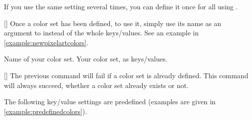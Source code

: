 \documentclass[
  load-preamble-,
  babel-options=english,
  add-index=true,
]{cnltx-doc}
\begin{document}
  If you use the same setting several times, you can define it once for all using .

\begin{commands}
  []
  Once a color set has been defined, to use it, simply use its name as an argument to  instead of the whole keys/values. See an example in \ref{example:newpixelartcolors}.
  \begin{options}
     Name of your color set.
     Your color set, as keys/values.
  \end{options}
  []
  The previous command will fail if a color set  is already defined. This command will always succeed, whether a color set  already exists or not.
\end{commands}

The following key/value settings are predefined (examples are given in \ref{example:predefinedcolors}).
\end{document}

